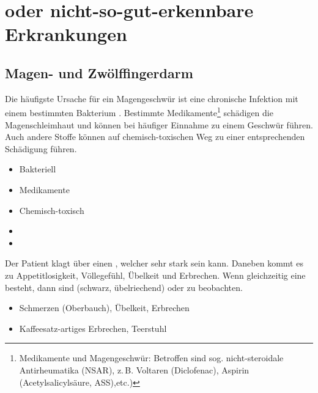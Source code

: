 \section{ oder nicht-so-gut-erkennbare Erkrankungen}

% 




\subsection{Magen- und Zwölffingerdarm}
\label{topic:gastritis}

{%
 Die häufigste Ursache für ein
Magengeschwür ist eine chronische Infektion mit einem
bestimmten Bakterium \citep{Malfertheiner2004}. Bestimmte
Medikamente\footnote{Medikamente und Magengeschwür:
Betroffen sind sog. nicht-steroidale Antirheumatika (NSAR),
z.\,B.
Voltaren{\texttrademark} (Diclofenac),
Aspirin{\texttrademark} (Acetylsalicylsäure, ASS),etc.)}
schädigen die Magenschleimhaut und können bei
häufiger Einnahme zu einem Geschwür führen. Auch andere
Stoffe können auf chemisch-toxischen Weg zu einer
entsprechenden Schädigung führen.  
}{
\begin{itemize}
    \item Bakteriell 
    \item Medikamente
    \item Chemisch-toxisch
    \item {}
    \item {}
\end{itemize}
}{}{}{}

\TextSlide{\TxSymptome}
{Der Patient klagt über einen
, welcher sehr stark sein
kann. Daneben kommt es zu Appetitlosigkeit, Völlegefühl,
Übelkeit und Erbrechen. Wenn gleichzeitig eine 
besteht, dann sind 
(schwarz, übelriechend) oder  zu beobachten. 
}{
\begin{itemize}
    \item Schmerzen (Oberbauch), Übelkeit, Erbrechen
    \item Kaffeesatz-artiges Erbrechen, Teerstuhl
\end{itemize}
}{}{}{}


